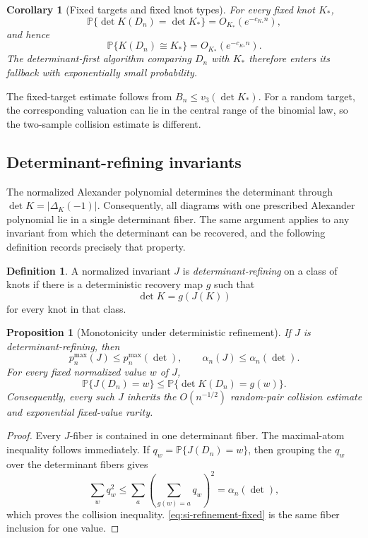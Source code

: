 \documentclass[9pt,twoside]{pnas-new}
\newtheorem{corollary}[theorem]{Corollary}
\newtheorem{proposition}[theorem]{Proposition}
\theoremstyle{definition}
\newtheorem{definition}[theorem]{Definition}
\theoremstyle{remark}
\renewcommand{\Pr}{\mathbb{P}}
\begin{document}
\begin{corollary}[Fixed targets and fixed knot types]
\label{cor:si-fixed-knot}
For every fixed knot $K_*$,
\[
 \Pr\{\det K(D_n)=\det K_*\}=O_{K_*}(e^{-c_{K_*}n}),
\]
and hence
\[
 \Pr\{K(D_n)\cong K_*\}=O_{K_*}(e^{-c_{K_*}n}).
\]
The determinant-first algorithm comparing $D_n$ with $K_*$ therefore enters its fallback with exponentially small probability.
\end{corollary}

The fixed-target estimate follows from $B_n\le v_3(\det K_*)$.  For a random target, the corresponding valuation can lie in the central range of the binomial law, so the two-sample collision estimate is different.

\subsection{Determinant-refining invariants}
The normalized Alexander polynomial determines the determinant through $\det K=\lvert\Delta_K(-1)\rvert$. Consequently, all diagrams with one prescribed Alexander polynomial lie in a single determinant fiber. The same argument applies to any invariant from which the determinant can be recovered, and the following definition records precisely that property.

\begin{definition}
A normalized invariant $J$ is \emph{determinant-refining} on a class of knots if there is a deterministic recovery map $g$ such that
\[
 \det K=g(J(K))
\]
for every knot in that class.
\end{definition}

\begin{proposition}[Monotonicity under deterministic refinement]
\label{prop:si-refinement-monotonicity}
If $J$ is determinant-refining, then
\begin{equation}
 p_n^{\max}(J)\le p_n^{\max}(\det),
 \qquad
 \alpha_n(J)\le\alpha_n(\det).
 \label{eq:si-refinement-collision}
\end{equation}
For every fixed normalized value $w$ of $J$,
\begin{equation}
 \Pr\{J(D_n)=w\}
 \le
 \Pr\{\det K(D_n)=g(w)\}.
 \label{eq:si-refinement-fixed}
\end{equation}
Consequently, every such $J$ inherits the $O(n^{-1/2})$ random-pair collision estimate and exponential fixed-value rarity.
\end{proposition}

\begin{proof}
Every $J$-fiber is contained in one determinant fiber.  The maximal-atom inequality follows immediately.  If $q_w=\Pr\{J(D_n)=w\}$, then grouping the $q_w$ over the determinant fibers gives
\[
 \sum_wq_w^2
 \le
 \sum_a\left(\sum_{g(w)=a}q_w\right)^2
 =\alpha_n(\det),
\]
which proves the collision inequality.  \eqref{eq:si-refinement-fixed} is the same fiber inclusion for one value.
\end{proof}
\end{document}
